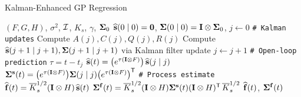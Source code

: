 \documentclass[dvipsnames, 11pt]{beamer}
\begin{document}
\begin{frame}{Kalman-Enhanced GP Regression \citep{Todescato-Efficient-2020}}
    \footnotesize
    \begin{algorithmic}[1]
        \Require $(F,G,H)$, $\sigma^{2}$, $\mathcal{I}$, $K_{s}$, $\gamma$, $\bm{\Sigma}_{0}$
        \State $\widehat{\mathbf{s}}(0 \mid 0) = \mathbf{0}$, $\bm{\Sigma}(0 \mid 0) = \mathbf{I} \otimes \bm{\Sigma}_{0}$, $j \gets 0$
        \Statex \texttt{\# Kalman updates}
            \State Compute $A(j), C(j), Q(j), R(j)$
            \State Compute $\widehat{\mathbf{s}}(j+1 \mid j+1), \bm{\Sigma}(j+1 \mid j+1)$ via Kalman filter update
            \State $j \gets j + 1$
        \EndWhile
        \Statex \texttt{\# Open-loop prediction}
        \State $\tau = t - t_{j}$
        \State $\widehat{\mathbf{s}}(t) = \big(e^{\tau(\mathbf{I} \otimes F)}\big)\,\widehat{\mathbf{s}}(j \mid j)$
        \State $\bm{\Sigma}^{\mathbf{s}}(t) = \big(e^{\tau(\mathbf{I} \otimes F)}\big)\bm{\Sigma}(j \mid j)\big(e^{\tau(\mathbf{I} \otimes F)}\big)^{\scriptstyle{\mathsf{T}}}$
        \Statex \texttt{\# Process estimate}
        \State $\widehat{\mathbf{f}}(t) = \overline{K}_{s}^{1/2}(\mathbf{I} \otimes H)\,\widehat{\mathbf{s}}(t)$
        \State $\bm{\Sigma}^{\mathbf{f}}(t) = \overline{K}_{s}^{1/2}(\mathbf{I} \otimes H)\bm{\Sigma}^{\mathbf{s}}(t)(\mathbf{I} \otimes H)^{\scriptstyle{\mathsf{T}}}\,\overline{K}_{s}^{1/2}$
        \State \Return $\widehat{\mathbf{f}}(t)$, $\bm{\Sigma}^{\mathbf{f}}(t)$
    \end{algorithmic}    
\end{frame}
\end{document}
